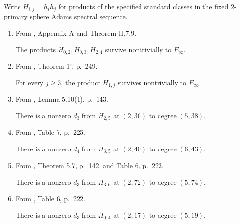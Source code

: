 \begin{theorem}
\label{frontier:Literature:83726561f77b}
Write $H_{i,j}=h_i h_j$ for products of the specified standard classes in the
fixed $2$-primary sphere Adams spectral sequence.
\begin{enumerate}
\item From \cite{MayThesis1964}, Appendix A and Theorem II.7.9.\par
The products $H_{0,2},H_{0,3},H_{2,4}$ survive nontrivially to $E_\infty$.
\item From \cite{Mahowaldetaj}, Theorem 1', p.~249.\par
For every $j\geq3$, the product $H_{1,j}$ survives nontrivially to $E_\infty$.
\item From \cite{IWX}, Lemma 5.10(1), p.~143.\par
There is a nonzero $d_3$ from $H_{2,5}$ at $(2,36)$ to degree $(5,38)$.
\item From \cite{IWX}, Table 7, p.~225.\par
There is a nonzero $d_4$ from $H_{3,5}$ at $(2,40)$ to degree $(6,43)$.
\item From \cite{IWX}, Theorem 5.7, p.~142, and Table 6, p.~223.\par
There is a nonzero $d_3$ from $H_{3,6}$ at $(2,72)$ to degree $(5,74)$.
\item From \cite{IWX}, Table 6, p.~222.\par
There is a nonzero $d_3$ from $H_{0,4}$ at $(2,17)$ to degree $(5,19)$.
\end{enumerate}
\end{theorem}
